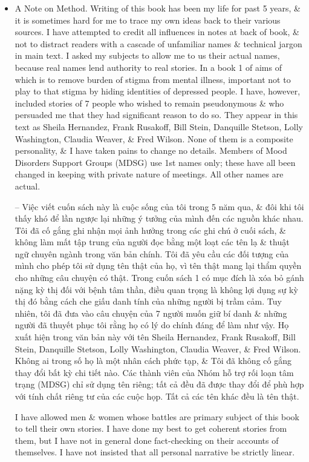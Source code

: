 \documentclass{article}
\begin{document}
\begin{itemize}
\begin{quote}
	\end{quote}
	\item {\sf A Note on Method.} Writing of this book has been my life for past 5 years, \& it is sometimes hard for me to trace my own ideas back to their various sources. I have attempted to credit all influences in notes at back of book, \& not to distract readers with a cascade of unfamiliar names \& technical jargon in main text. I asked my subjects to allow me to us their actual names, because real names lend authority to  real stories. In a book 1 of aims of which is to remove burden of stigma from mental illness, important not to play to that stigma by hiding identities of depressed people. I have, however, included stories of 7 people who wished to remain pseudonymous \& who persuaded me that they had significant reason to do so. They appear in this text as {\sc Sheila Hernandez, Frank Rusakoff, Bill Stein, Danquille Stetson, Lolly Washington, Claudia Weaver, \& Fred Wilson}. None of them is a composite personality, \& I have taken pains to change no details. Members of Mood Disorders Support Groups (MDSG) use 1st names only; these have all been changed in keeping with private nature of meetings. All other names are actual.
	
	-- Việc viết cuốn sách này là cuộc sống của tôi trong 5 năm qua, \& đôi khi tôi thấy khó để lần ngược lại những ý tưởng của mình đến các nguồn khác nhau. Tôi đã cố gắng ghi nhận mọi ảnh hưởng trong các ghi chú ở cuối sách, \& không làm mất tập trung của người đọc bằng một loạt các tên lạ \& thuật ngữ chuyên ngành trong văn bản chính. Tôi đã yêu cầu các đối tượng của mình cho phép tôi sử dụng tên thật của họ, vì tên thật mang lại thẩm quyền cho những câu chuyện có thật. Trong cuốn sách 1 có mục đích là xóa bỏ gánh nặng kỳ thị đối với bệnh tâm thần, điều quan trọng là không lợi dụng sự kỳ thị đó bằng cách che giấu danh tính của những người bị trầm cảm. Tuy nhiên, tôi đã đưa vào câu chuyện của 7 người muốn giữ bí danh \& những người đã thuyết phục tôi rằng họ có lý do chính đáng để làm như vậy. Họ xuất hiện trong văn bản này với tên {\sc Sheila Hernandez, Frank Rusakoff, Bill Stein, Danquille Stetson, Lolly Washington, Claudia Weaver, \& Fred Wilson}. Không ai trong số họ là một nhân cách phức tạp, \& Tôi đã không cố gắng thay đổi bất kỳ chi tiết nào. Các thành viên của Nhóm hỗ trợ rối loạn tâm trạng (MDSG) chỉ sử dụng tên riêng; tất cả đều đã được thay đổi để phù hợp với tính chất riêng tư của các cuộc họp. Tất cả các tên khác đều là tên thật.
	
	I have allowed men \& women whose battles are primary subject of this book to tell their own stories. I have done my best to get coherent stories from them, but I have not in general done fact-checking on their accounts of themselves. I have not insisted that all personal narrative be strictly linear.
	

\end{itemize}
\end{document}
